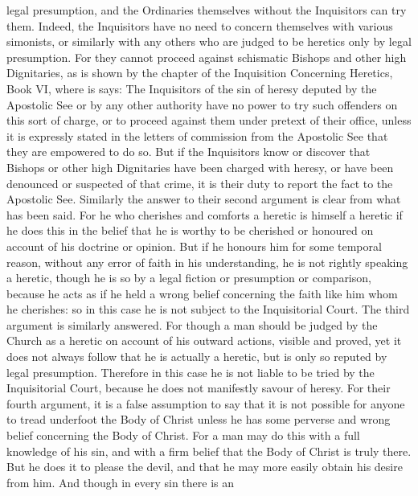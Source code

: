        legal presumption, and the Ordinaries themselves without the Inquisitors can try them.
       Indeed, the Inquisitors have no need to concern themselves with various simonists, or
       similarly with any others who are judged to be heretics only by legal presumption. For they
       cannot proceed against schismatic Bishops and other high Dignitaries, as is shown by the
       chapter of the Inquisition Concerning Heretics, Book VI, where is says: The Inquisitors of
       the sin of heresy deputed by the Apostolic See or by any other authority have no power to
       try such offenders on this sort of charge, or to proceed against them under pretext of their
       office, unless it is expressly stated in the letters of commission from the Apostolic See that
       they are empowered to do so.
             But if the Inquisitors know or discover that Bishops or other high Dignitaries have been
       charged with heresy, or have been denounced or suspected of that crime, it is their duty to
       report the fact to the Apostolic See.
             Similarly the answer to their second argument is clear from what has been said. For he
       who cherishes and comforts a heretic is himself a heretic if he does this in the belief that he
       is worthy to be cherished or honoured on account of his doctrine or opinion. But if he
       honours him for some temporal reason, without any error of faith in his understanding, he is
       not rightly speaking a heretic, though he is so by a legal fiction or presumption or
       comparison, because he acts as if he held a wrong belief concerning the faith like him whom
       he cherishes: so in this case he is not subject to the Inquisitorial Court.
             The third argument is similarly answered. For though a man should be judged by the
       Church as a heretic on account of his outward actions, visible and proved, yet it does not
       always follow that he is actually a heretic, but is only so reputed by legal presumption.
       Therefore in this case he is not liable to be tried by the Inquisitorial Court, because he does
       not manifestly savour of heresy.
             For their fourth argument, it is a false assumption to say that it is not possible for
       anyone to tread underfoot the Body of Christ unless he has some perverse and wrong belief
       concerning the Body of Christ. For a man may do this with a full knowledge of his sin, and
       with a firm belief that the Body of Christ is truly there. But he does it to please the devil,
       and that he may more easily obtain his desire from him. And though in every sin there is an
